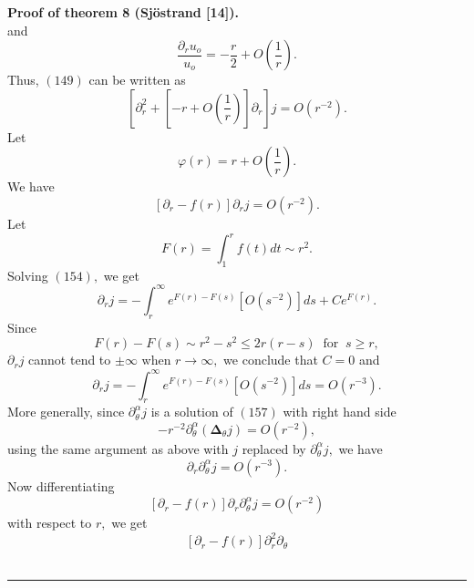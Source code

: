 \documentclass{article}
\newenvironment{proof}[1][Proof]{\noindent\textbf{#1.} }{\ \rule{0.5em}{0.5em}}
\begin{document}
\begin{proof}[{Proof of theorem 8 (Sj\"{o}strand [14])}]
\begin{equation}
\end{equation}%
and 
\begin{equation}
\dfrac{\partial _{r}u_{o}}{u_{o}}=-\dfrac{r}{2}+O(\dfrac{1}{r}).
\end{equation}%
Thus, $\left( 149\right) $ can be written as 
\begin{equation}
\left[ \partial _{r}^{2}+\left[ -r+O(\dfrac{1}{r})\right] \partial _{r}%
\right] j=O(r^{-2}).
\end{equation}%
Let 
\begin{equation}
\varphi (r)=r+O(\dfrac{1}{r}).
\end{equation}%
We have 
\begin{equation}
\left[ \partial _{r}-f(r)\right] \partial _{r}j=O(r^{-2}).
\end{equation}%
Let 
\begin{equation}
F(r)=\int_{1}^{r}f(t)dt\sim r^{2}.
\end{equation}%
Solving $\left( 154\right) ,$ we get 
\begin{equation}
\partial _{r}j=-\int_{r}^{\infty }e^{F(r)-F(s)}\left[ O(s^{-2})\right]
ds+Ce^{F(r)}.
\end{equation}%
Since%
\begin{equation}
F(r)-F(s)\sim r^{2}-s^{2}\leq 2r(r-s)\;\;\text{for}\;\;s\geq r,
\end{equation}%
$\partial _{r}j$ cannot tend to $\pm \infty $ when $r\rightarrow \infty ,$
we conclude that $C=0$ and 
\begin{equation}
\partial _{r}j=-\int_{r}^{\infty }e^{F(r)-F(s)}\left[ O(s^{-2})\right]
ds=O(r^{-3}).
\end{equation}%
More generally, since $\partial _{\theta }^{\alpha }j$ is a solution of $%
\left( 157\right) $ with right hand side%
\begin{equation}
-r^{-2}\partial _{\theta }^{\alpha }\left( \mathbf{\Delta }_{\theta
}j\right) =O(r^{-2}),
\end{equation}%
using the same argument as above with $j$ replaced by $\partial _{\theta
}^{\alpha }j,$ we have 
\begin{equation}
\partial _{r}\partial _{\theta }^{\alpha }j=O(r^{-3}).
\end{equation}%
Now differentiating 
\begin{equation}
\left[ \partial _{r}-f(r)\right] \partial _{r}\partial _{\theta }^{\alpha
}j=O(r^{-2})
\end{equation}%
with respect to $r,$ we get 
\begin{equation}
\left[ \partial _{r}-f(r)\right] \partial _{r}^{2}\partial _{\theta
}
\end{equation}
\end{proof}
\end{document}
